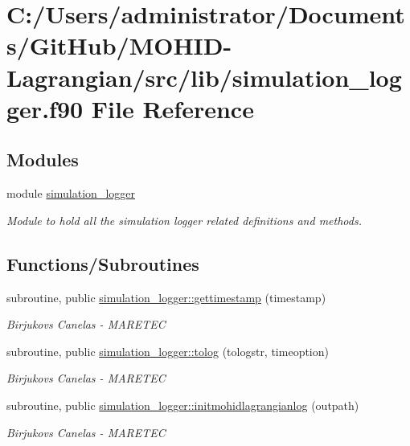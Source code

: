 \hypertarget{simulation__logger_8f90}{}\section{C\+:/\+Users/administrator/\+Documents/\+Git\+Hub/\+M\+O\+H\+I\+D-\/\+Lagrangian/src/lib/simulation\+\_\+logger.f90 File Reference}
\label{simulation__logger_8f90}
\subsection*{Modules}
\begin{DoxyCompactItemize}
\item 
module \mbox{\hyperlink{namespacesimulation__logger}{simulation\+\_\+logger}}
\begin{DoxyCompactList}\small\item\em Module to hold all the simulation logger related definitions and methods. \end{DoxyCompactList}\end{DoxyCompactItemize}
\subsection*{Functions/\+Subroutines}
\begin{DoxyCompactItemize}
\item 
subroutine, public \mbox{\hyperlink{namespacesimulation__logger_a13446c36aac51547a72b39003f735257}{simulation\+\_\+logger\+::gettimestamp}} (timestamp)
\begin{DoxyCompactList}\small\item\em Birjukovs Canelas -\/ M\+A\+R\+E\+T\+EC \end{DoxyCompactList}\item 
subroutine, public \mbox{\hyperlink{namespacesimulation__logger_a3aaa69ec168b6f34d703fb4033a22d92}{simulation\+\_\+logger\+::tolog}} (tologstr, timeoption)
\begin{DoxyCompactList}\small\item\em Birjukovs Canelas -\/ M\+A\+R\+E\+T\+EC \end{DoxyCompactList}\item 
subroutine, public \mbox{\hyperlink{namespacesimulation__logger_a9c7922c1d3cd57c8322f047799fc6053}{simulation\+\_\+logger\+::initmohidlagrangianlog}} (outpath)
\begin{DoxyCompactList}\small\item\em Birjukovs Canelas -\/ M\+A\+R\+E\+T\+EC \end{DoxyCompactList}\end{DoxyCompactItemize}
